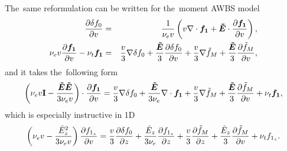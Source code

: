 \documentclass[preprint,12pt]{elsarticle}
\newcounter{bla}
\begin{document}
The~same reformulation can be written for the~moment AWBS model
\begin{eqnarray}
  \frac{\partial{\delta f_0}}{\partial{v}} &=&
  \frac{1}{\nu_{e}v}\left(v\nabla\cdot\boldsymbol{f_1} + \boldsymbol{\tilde{E}}\cdot
  \frac{\partial{\boldsymbol{f_1}}}{\partial{v}}\right) , 
  \nonumber\\
  \nu_{e}v\frac{\partial{\boldsymbol{f_1}}}{\partial{v}} - \nu_{t}\boldsymbol{f_1} &=& 
  \frac{v}{3}\nabla\delta f_0 + 
  \frac{\boldsymbol{\tilde{E}}}{3}\frac{\partial{\delta f_0}}{\partial{v}}
  + \frac{v}{3}\nabla\tilde{f}_M + \frac{\boldsymbol{\tilde{E}}}{3}\frac{\partial{\tilde{f}_M}}{\partial{v}} ,
  \nonumber
\end{eqnarray}
and it takes the~following form
\begin{equation}
  \left(\nu_{e}v\mathbf{I} - \frac{\boldsymbol{\tilde{E}}\boldsymbol{\tilde{E}}}{3 \nu_{e}v}\right)\cdot
  \frac{\partial{\boldsymbol{f_1}}}{\partial{v}} = 
  \frac{v}{3}\nabla\delta f_0 + \frac{\boldsymbol{\tilde{E}}}{3 \nu_{e}}\nabla\cdot\boldsymbol{f_1}
  + \frac{v}{3}\nabla\tilde{f}_M + \frac{\boldsymbol{\tilde{E}}}{3}\frac{\partial{\tilde{f}_M}}{\partial{v}} 
  + \nu_{t}\boldsymbol{f_1} ,
  \nonumber \label{eq:OOE_P1AWBS_model_analysis}
\end{equation}
which is especially instructive in 1D
\begin{equation}
  \left(\nu_{e}v - \frac{\tilde{E}_z^2}{3 \nu_{e}v}\right)
  \frac{\partial{f_{1_z}}}{\partial{v}} = 
  \frac{v}{3}\frac{\partial{\delta f_0}}{\partial{z}} + \frac{\tilde{E}_z}{3 \nu_{e}}\frac{\partial{f_{1_z}}}{\partial{z}}
  + \frac{v}{3}\frac{\partial{\tilde{f}_M}}{\partial{z}} + \frac{\tilde{E}_z}{3}\frac{\partial{\tilde{f}_M}}{\partial{v}} 
  + \nu_{t}f_{1_z} .
  \label{eq:OOE_P1AWBS_model_1Danalysis}
\end{equation}
\end{document}
